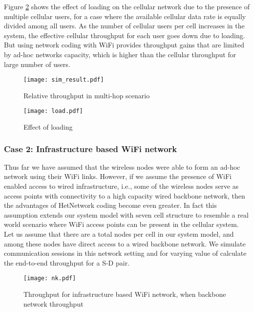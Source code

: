 \documentclass{sig-alternate-10pt}
\begin{document}
Figure \ref{fig:load} shows the effect of loading on the cellular network due to the presence of multiple cellular users, for a case where the available cellular data rate is equally divided among all users. As the number of cellular users per cell increases in the system, the effective cellular throughput for each user goes down due to loading. But using  network coding with WiFi provides throughput gains that are limited by ad-hoc networks capacity, which is higher than the cellular throughput for large number of users.


\begin{figure}[t]
\texttt{[image: sim\_result.pdf]}
\caption{Relative throughput in multi-hop scenario}
\label{fig:rate}
\end{figure}

\begin{figure}[t]
\texttt{[image: load.pdf]}
\caption{Effect of loading}
\label{fig:load}
\end{figure}


\subsubsection{Case 2: Infrastructure based WiFi network}
Thus far we have assumed that the wireless nodes were able to form an ad-hoc network using their WiFi links. However, if we assume the presence of WiFi enabled access to wired infrastructure, i.e., some of the wireless nodes serve as access points with connectivity to a high capacity wired backbone network, then the advantages of HetNetwork coding become even greater. In fact this assumption  extends our system model with seven cell structure to resemble a  real world scenario where WiFi access points can be present in the cellular system. Let us assume that there are a total  nodes per cell in  our system model, and among these  nodes have direct access to a wired backbone network. We simulate communication sessions in this network setting and for varying value of  calculate the end-to-end throughput for a S-D pair.
\begin{figure}[t]
\texttt{[image: nk.pdf]}
\caption{Throughput for infrastructure based WiFi network, when backbone network throughput   }
\label{fig:nk}
\end{figure}
\end{document}
